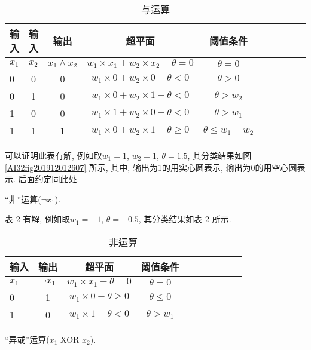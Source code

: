\begin{table}[H]
\caption{与运算}
\begin{center}
\begin{tabular} {lccccccccc}
  \hline
输入&输入	&输出&超平面&	阈值条件\\
\hline
$x_1$&$x_2$&$x_1\wedge x_2$	&$w_1\times x_1+ w_2\times  x_2-\theta=0$  &$\theta= 0$\\
0&	0&	0&$w_1\times 0+ w_2\times 0-\theta <  0$ 	&$\theta> 0$\\
0&	1&0	&$w_1\times0 + w_2\times1-\theta < 0$ 	&$\theta>w_2$\\
1&	0&	0&$w_1\times1+ w_2\times 0 -\theta <0$ 	    &$\theta >w_1$\\
1&	1&	1&$w_1\times0 + w_2\times 1-\theta \geq 0$ 	&$\theta\leq w_1+w_2$\\
\hline
\end{tabular}
\end{center}
\label{AI_table2019112900011}
\end{table}

可以证明此表有解, 例如取$w_1=1$, $w_2=1$, $\theta=1.5$, 其分类结果如图 \ref{AI32fig201912012607} 所示,
其中, 输出为1的用实心圆表示, 输出为0的用空心圆表示. 后面约定同此处.
\begin{example}
    “非”运算($\neg x_1$).
\end{example}

表 \ref{AI_table2019112902} 有解, 例如取$w_1=-1$, $\theta=-0.5$, 其分类结果如表 \ref{AI_table2019112902} 所示.
\begin{table}[H]
\vspace{-0.4cm}
\caption{非运算}
\begin{center}
\begin{tabular} {lccccccccc}
  \hline
输入&	输出&	超平面&	阈值条件\\
\hline
$x_1$&	$\neg x_1$&	$w_1\times x_1-\theta=0$        &$\theta =0$\\
0&	1             &	$w_1\times 0 -\theta \geq 0$ 	&$\theta\leq 0$\\
1&	0             &	$w_1\times 1 -\theta <0$ 	    &$\theta >w_1$\\
\hline
\end{tabular}
\end{center}
\label{AI_table2019112902}
\end{table}

\begin{example}
    “异或”运算($x_1$ {\footnotesize XOR} $x_2$).
\end{example}

